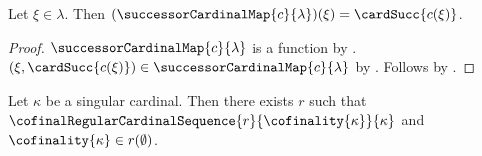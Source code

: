 \begin{proposition}\label{successor_cardinal_map_apply}
    Let $\xi\in\lambda$.
    Then $(\successorCardinalMap{c}{\lambda})(\xi)
        =\cardSucc{c(\xi)}$.
\end{proposition}
\begin{proof}
    $\successorCardinalMap{c}{\lambda}$ is a function by
        .
    $(\xi,\cardSucc{c(\xi)})
        \in\successorCardinalMap{c}{\lambda}$ by
        .
    Follows by .
\end{proof}

\begin{theorem}\label{cofinal_regular_sequence_above_index_exists}
    Let $\kappa$ be a singular cardinal.
    Then there exists $r$ such that
        $\cofinalRegularCardinalSequence
            {r}{\cofinality{\kappa}}{\kappa}$ and
        $\cofinality{\kappa}\in r(\emptyset)$.
\end{theorem}
